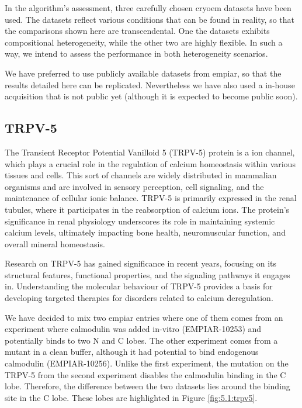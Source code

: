 \documentclass[../main.tex]{subfiles}
\begin{document}
In the algorithm's assessment, three carefully chosen \gls{cryoem} datasets have been used. The datasets reflect various conditions that can be found in reality, so that the comparisons shown here are transcendental. One the datasets exhibits compositional heterogeneity, while the other two are highly flexible. In such a way, we intend to assess the performance in both heterogeneity scenarios.

We have preferred to use publicly available datasets from \gls{empiar}, so that the results detailed here can be replicated. Nevertheless we have also used a in-house acquisition that is not public yet (although it is expected to become public soon).

\subsection{TRPV-5}
The Transient Receptor Potential Vanilloid 5 (TRPV-5) protein is a ion channel, which plays a crucial role in the regulation of calcium homeostasis within various tissues and cells. This sort of channels are widely distributed in mammalian organisms and are involved in sensory perception, cell signaling, and the maintenance of cellular ionic balance. TRPV-5 is primarily expressed in the renal tubules, where it participates in the reabsorption of calcium ions. The protein's significance in renal physiology underscores its role in maintaining systemic calcium levels, ultimately impacting bone health, neuromuscular function, and overall mineral homeostasis.

Research on TRPV-5 has gained significance in recent years, focusing on its structural features, functional properties, and the signaling pathways it engages in. Understanding the molecular behaviour of TRPV-5 provides a basis for developing targeted therapies for disorders related to calcium deregulation.

We have decided to mix two \gls{empiar} entries where one of them comes from an experiment where calmodulin was added in-vitro (EMPIAR-10253) and potentially binds to two N and C lobes. The other experiment comes from a mutant in a clean buffer, although it had potential to bind endogenous calmodulin (EMPIAR-10256). Unlike the first experiment, the mutation on the TRPV-5 from the second experiment disables the calmodulin binding in the C lobe. Therefore, the difference between the two datasets lies around the binding site in the C lobe\cite{zhou2022}\cite{dang2019}. These lobes are highlighted in Figure \ref{fig:5.1:trpv5}.
\end{document}
